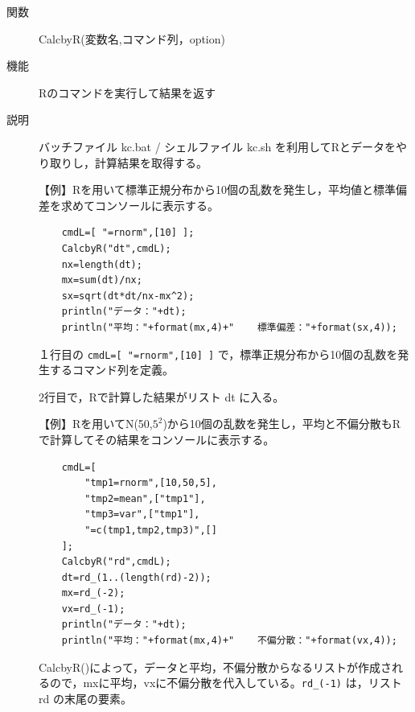 \documentclass[papersize,a4paper,12pt,uplatex]{jsarticle}
\begin{document}
\begin{description}
\hypertarget{calcbyr}{}
\item[関数]  CalcbyR(変数名,コマンド列，option)
\item[機能]  Rのコマンドを実行して結果を返す
\item[説明]  バッチファイル kc.bat / シェルファイル kc.sh を利用してRとデータをやり取りし，計算結果を取得する。

\vspace{\baselineskip}
【例】Rを用いて標準正規分布から10個の乱数を発生し，平均値と標準偏差を求めてコンソールに表示する。
\begin{verbatim}
    cmdL=[ "=rnorm",[10] ];
    CalcbyR("dt",cmdL);
    nx=length(dt);
    mx=sum(dt)/nx;
    sx=sqrt(dt*dt/nx-mx^2);
    println("データ："+dt);
    println("平均："+format(mx,4)+"    標準偏差："+format(sx,4));
\end{verbatim}
１行目の  \verb|cmdL=[ "=rnorm",[10] ]|  で，標準正規分布から10個の乱数を発生するコマンド列を定義。

2行目で，Rで計算した結果がリスト dt に入る。

\vspace{\baselineskip}
【例】Rを用いてN(50,$5^2$)から10個の乱数を発生し，平均と不偏分散もRで計算してその結果をコンソールに表示する。
\begin{verbatim}
    cmdL=[
        "tmp1=rnorm",[10,50,5],
        "tmp2=mean",["tmp1"],
        "tmp3=var",["tmp1"],
        "=c(tmp1,tmp2,tmp3)",[]
    ];
    CalcbyR("rd",cmdL);
    dt=rd_(1..(length(rd)-2));
    mx=rd_(-2);
    vx=rd_(-1);
    println("データ："+dt);
    println("平均："+format(mx,4)+"    不偏分散："+format(vx,4));
\end{verbatim}
  CalcbyR()によって，データと平均，不偏分散からなるリストが作成されるので，mxに平均，vxに不偏分散を代入している。\verb|rd_(-1)| は，リスト rd の末尾の要素。
  

\end{description}
\end{document}
